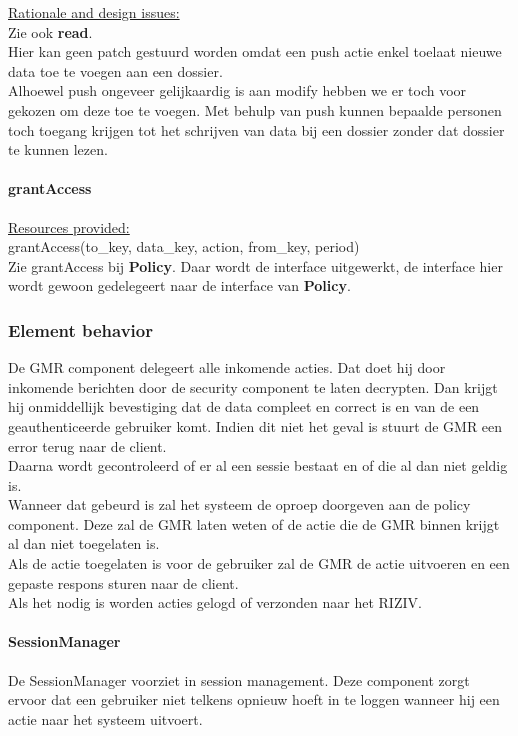 \documentclass[a4paper,10pt]{article}
\begin{document}
\underline{Rationale and design issues:}\\
Zie ook \textbf{read}.\\
Hier kan geen patch gestuurd worden omdat een push actie enkel toelaat nieuwe data toe te voegen aan een dossier.\\
Alhoewel push ongeveer gelijkaardig is aan modify hebben we er toch voor gekozen om deze toe te voegen.  Met behulp van push kunnen bepaalde personen toch toegang krijgen tot het schrijven van data bij een dossier zonder dat dossier te kunnen lezen.

\paragraph{grantAccess}
\underline{Resources provided:}\\
grantAccess(to\_key, data\_key, action, from\_key, period)\\
Zie grantAccess bij \textbf{Policy}.  Daar wordt de interface uitgewerkt, de interface hier wordt gewoon gedelegeert naar de interface van \textbf{Policy}.

\subsubsection{Element behavior}
De GMR component delegeert alle inkomende acties.  Dat doet hij door inkomende berichten door de security component te laten decrypten.  Dan krijgt hij onmiddellijk bevestiging dat de data compleet en correct is en van de een geauthenticeerde gebruiker komt.  Indien dit niet het geval is stuurt de GMR een error terug naar de client.\\
Daarna wordt gecontroleerd of er al een sessie bestaat en of die al dan niet geldig is.\\
Wanneer dat gebeurd is zal het systeem de oproep doorgeven aan de policy component.  Deze zal de GMR laten weten of de actie die de GMR binnen krijgt al dan niet toegelaten is.\\
Als de actie toegelaten is voor de gebruiker zal de GMR de actie uitvoeren en een gepaste respons sturen naar de client.\\
Als het nodig is worden acties gelogd of verzonden naar het RIZIV.\\

\paragraph{SessionManager}
De SessionManager voorziet in session management.  Deze component zorgt ervoor dat een gebruiker niet telkens opnieuw hoeft in te loggen wanneer hij een actie naar het systeem uitvoert.
\end{document}
